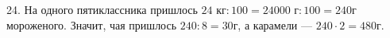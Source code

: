 24. На одного пятиклассника пришлось $24\text{ кг}:100=24000\text{ г}:100=240$г мороженого. Значит, чая пришлось $240:8=30$г, а карамели --- $240\cdot2=480$г.\\
